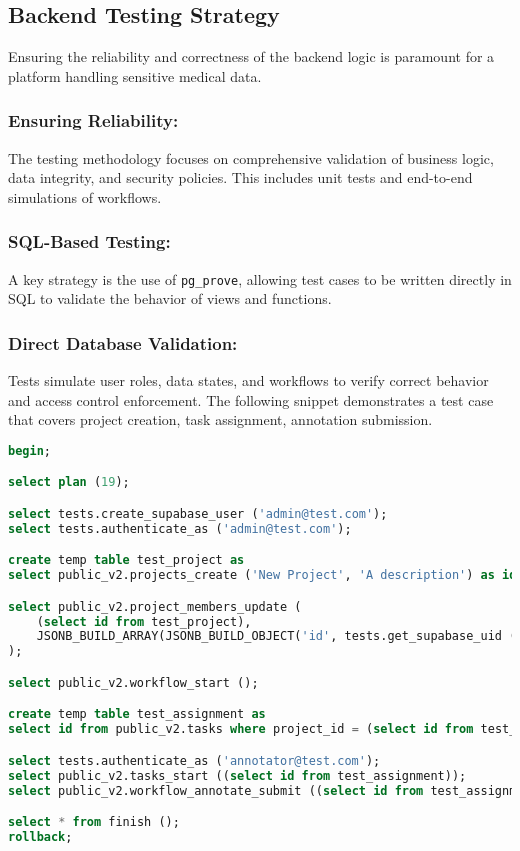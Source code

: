 \subsection{Backend Testing Strategy}

Ensuring the reliability and correctness of the backend logic is paramount for a platform handling sensitive medical data.

\subsubsection*{Ensuring Reliability:} 
The testing methodology focuses on comprehensive validation of business logic, data integrity, and security policies. This includes unit tests and end-to-end simulations of workflows.

\subsubsection*{SQL-Based Testing:} 
A key strategy is the use of \texttt{pg\_prove}, allowing test cases to be written directly in SQL to validate the behavior of views and functions.

\subsubsection*{Direct Database Validation:} 
Tests simulate user roles, data states, and workflows to verify correct behavior and access control enforcement. The following snippet demonstrates a test case that covers project creation, task assignment, annotation submission.
\begin{lstlisting}[language=SQL]
begin;

select plan (19);

select tests.create_supabase_user ('admin@test.com');
select tests.authenticate_as ('admin@test.com');

create temp table test_project as
select public_v2.projects_create ('New Project', 'A description') as id;

select public_v2.project_members_update (
    (select id from test_project),
    JSONB_BUILD_ARRAY(JSONB_BUILD_OBJECT('id', tests.get_supabase_uid ('annotator@test.com'), 'role_id', '2d0ac3ac-abd8-4611-bd86-c90ec4d7271c'))
);

select public_v2.workflow_start ();

create temp table test_assignment as
select id from public_v2.tasks where project_id = (select id from test_project) and status = 'PENDING' limit 1;

select tests.authenticate_as ('annotator@test.com');
select public_v2.tasks_start ((select id from test_assignment));
select public_v2.workflow_annotate_submit ((select id from test_assignment), 'segmentationid');

select * from finish ();
rollback;

\end{lstlisting}
